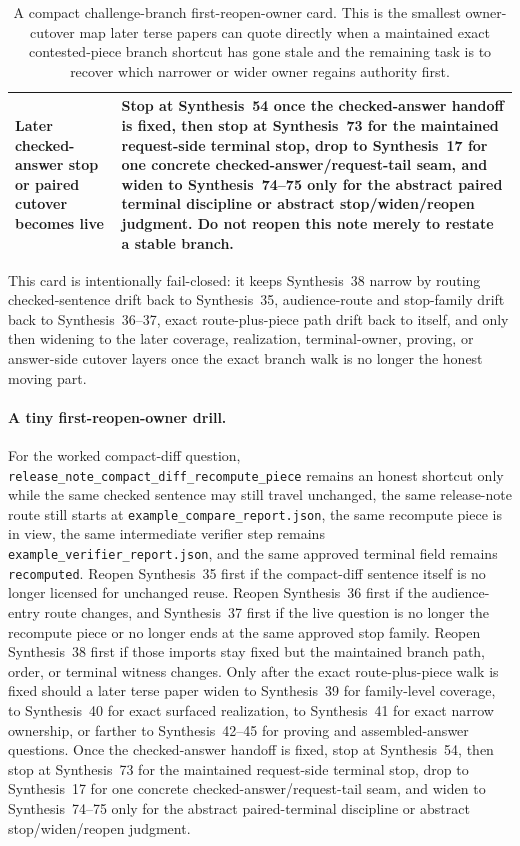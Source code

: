 \documentclass[11pt]{article}
\begin{document}
\begin{table}[t]
\begin{tabularx}{\linewidth}{@{}lX@{}}
Later checked-answer stop or paired cutover becomes live & Stop at Synthesis~54 once the checked-answer handoff is fixed, then stop at Synthesis~73 for the maintained request-side terminal stop, drop to Synthesis~17 for one concrete checked-answer/request-tail seam, and widen to Synthesis~74--75 only for the abstract paired terminal discipline or abstract stop/widen/reopen judgment. Do not reopen this note merely to restate a stable branch. \\
\bottomrule
\end{tabularx}
\caption{A compact challenge-branch first-reopen-owner card. This is the smallest owner-cutover map later terse papers can quote directly when a maintained exact contested-piece branch shortcut has gone stale and the remaining task is to recover which narrower or wider owner regains authority first.}
\label{tab:challenge-branch-first-reopen-owner-card}
\end{table}

This card is intentionally fail-closed: it keeps Synthesis~38 narrow by routing checked-sentence drift back to Synthesis~35, audience-route and stop-family drift back to Synthesis~36--37, exact route-plus-piece path drift back to itself, and only then widening to the later coverage, realization, terminal-owner, proving, or answer-side cutover layers once the exact branch walk is no longer the honest moving part.

\paragraph{A tiny first-reopen-owner drill.}
For the worked compact-diff question, \nolinkurl{release_note_compact_diff_recompute_piece} remains an honest shortcut only while the same checked sentence may still travel unchanged, the same release-note route still starts at \nolinkurl{example_compare_report.json}, the same recompute piece is in view, the same intermediate verifier step remains \nolinkurl{example_verifier_report.json}, and the same approved terminal field remains \nolinkurl{recomputed}. Reopen Synthesis~35 first if the compact-diff sentence itself is no longer licensed for unchanged reuse. Reopen Synthesis~36 first if the audience-entry route changes, and Synthesis~37 first if the live question is no longer the recompute piece or no longer ends at the same approved stop family. Reopen Synthesis~38 first if those imports stay fixed but the maintained branch path, order, or terminal witness changes. Only after the exact route-plus-piece walk is fixed should a later terse paper widen to Synthesis~39 for family-level coverage, to Synthesis~40 for exact surfaced realization, to Synthesis~41 for exact narrow ownership, or farther to Synthesis~42--45 for proving and assembled-answer questions. Once the checked-answer handoff is fixed, stop at Synthesis~54, then stop at Synthesis~73 for the maintained request-side terminal stop, drop to Synthesis~17 for one concrete checked-answer/request-tail seam, and widen to Synthesis~74--75 only for the abstract paired-terminal discipline or abstract stop/widen/reopen judgment.\cite{series:workedexample}
\end{document}
